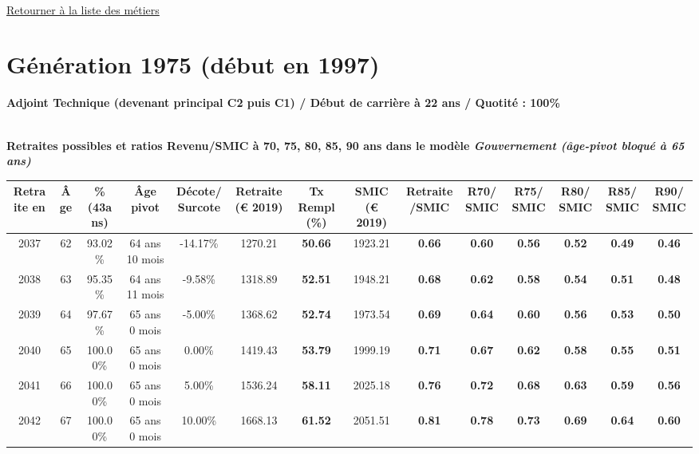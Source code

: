 ~\\ 
 
 \hyperlink{page.2}{\noindent Retourner à la liste des métiers}

 \newpage 

\section{Génération 1975 (début en 1997)\label{AdjTech_100_1975_22_0}} 
 
{\bf \noindent Adjoint Technique (devenant principal C2 puis C1) / Début de carrière à 22 ans / Quotité : 100\%}  ~ 

 ~\\{\bf \noindent Retraites possibles et ratios Revenu/SMIC à 70, 75, 80, 85, 90 ans dans le modèle \emph{Gouvernement (âge-pivot bloqué à 65 ans)}}  
 
\begin{adjustbox}{max width=\textwidth} 
\begin{tabular}[htb]{|c|c||c|c|c||c|c||c|c||c|c|c|c|c|} 
\hline 
 Retraite en &  Âge &  \%(43ans) &  Âge pivot &  Décote/Surcote &  Retraite (\euro{} 2019) &  Tx Rempl(\%) &  SMIC (\euro{} 2019) &  Retraite/SMIC &  R70/SMIC &  R75/SMIC &  R80/SMIC &  R85/SMIC &  R90/SMIC \\ 
\hline \hline 
 2037 &  62 &  93.02\% &  64 ans 10 mois &  -14.17\% &  1270.21 &  {\bf 50.66} &  1923.21 &  {\bf {\color{red} 0.66}} &  {\bf {\color{red} 0.60}} &  {\bf {\color{red} 0.56}} &  {\bf {\color{red} 0.52}} &  {\bf {\color{red} 0.49}} &  {\bf {\color{red} 0.46}} \\ 
\hline 
 2038 &  63 &  95.35\% &  64 ans 11 mois &  -9.58\% &  1318.89 &  {\bf 52.51} &  1948.21 &  {\bf {\color{red} 0.68}} &  {\bf {\color{red} 0.62}} &  {\bf {\color{red} 0.58}} &  {\bf {\color{red} 0.54}} &  {\bf {\color{red} 0.51}} &  {\bf {\color{red} 0.48}} \\ 
\hline 
 2039 &  64 &  97.67\% &  65 ans 0 mois &  -5.00\% &  1368.62 &  {\bf 52.74} &  1973.54 &  {\bf {\color{red} 0.69}} &  {\bf {\color{red} 0.64}} &  {\bf {\color{red} 0.60}} &  {\bf {\color{red} 0.56}} &  {\bf {\color{red} 0.53}} &  {\bf {\color{red} 0.50}} \\ 
\hline 
 2040 &  65 &  100.00\% &  65 ans 0 mois &  0.00\% &  1419.43 &  {\bf 53.79} &  1999.19 &  {\bf {\color{red} 0.71}} &  {\bf {\color{red} 0.67}} &  {\bf {\color{red} 0.62}} &  {\bf {\color{red} 0.58}} &  {\bf {\color{red} 0.55}} &  {\bf {\color{red} 0.51}} \\ 
\hline 
 2041 &  66 &  100.00\% &  65 ans 0 mois &  5.00\% &  1536.24 &  {\bf 58.11} &  2025.18 &  {\bf {\color{red} 0.76}} &  {\bf {\color{red} 0.72}} &  {\bf {\color{red} 0.68}} &  {\bf {\color{red} 0.63}} &  {\bf {\color{red} 0.59}} &  {\bf {\color{red} 0.56}} \\ 
\hline 
 2042 &  67 &  100.00\% &  65 ans 0 mois &  10.00\% &  1668.13 &  {\bf 61.52} &  2051.51 &  {\bf {\color{red} 0.81}} &  {\bf {\color{red} 0.78}} &  {\bf {\color{red} 0.73}} &  {\bf {\color{red} 0.69}} &  {\bf {\color{red} 0.64}} &  {\bf {\color{red} 0.60}} \\ 
\hline 
\hline 
\end{tabular} 
\end{adjustbox} 
 
